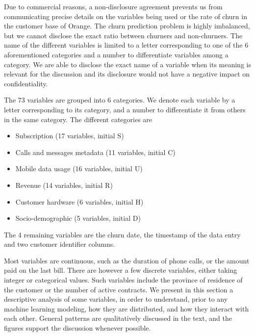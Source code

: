 Due to commercial reasons, a non-disclosure agreement prevents us from
communicating precise details on the variables being used or the rate of churn
in the customer base of Orange. The churn prediction problem is highly
imbalanced, but we cannot disclose the exact ratio between churners and
non-churners. The name of the different variables is limited to a letter
corresponding to one of the 6 aforementioned categories and a number to
differentiate variables among a category. We are able to disclose the exact name
of a variable when its meaning is relevant for the discussion and its disclosure
would not have a negative impact on confidentiality.

The 73 variables are grouped into 6 categories. We denote each variable by a
letter corresponding to its category, and a number to differentiate it from
others in the same category. The different categories are

\begin{itemize}
    \item Subscription (17 variables, initial S)
    \item Calls and messages metadata (11 variables, initial C)
    \item Mobile data usage (16 variables, initial U)
    \item Revenue (14 variables, initial R)
    \item Customer hardware (6 variables, initial H)
    \item Socio-demographic (5 variables, initial D)
\end{itemize}

The 4 remaining variables are the churn date, the timestamp of the data entry
and two customer identifier columns.

Most variables are continuous, such as the duration of phone calls, or the
amount paid on the last bill. There are however a few discrete variables, either
taking integer or categorical values. Such variables include the province of
residence of the customer or the number of active contracts. We present in this
section a descriptive analysis of some variables, in order to understand, prior
to any machine learning modeling, how they are distributed, and how they
interact with each other. General patterns are qualitatively discussed in the
text, and the figures support the discussion whenever possible.

